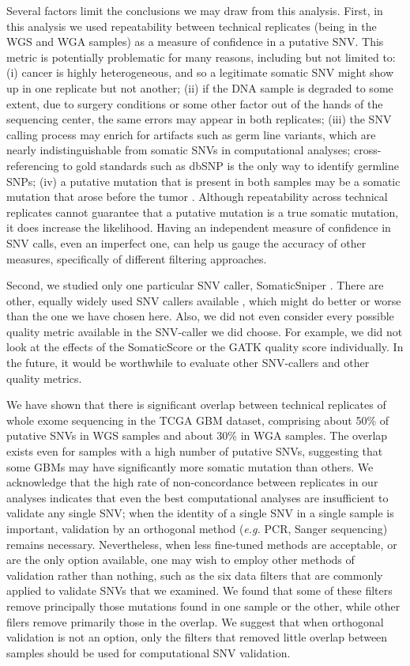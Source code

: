 \documentclass[11 pt]{article} %
\begin{document}
Several factors limit the conclusions we may draw from this analysis. First, in this analysis we used repeatability between technical replicates (being in the WGS and WGA samples) as a measure of confidence in a putative SNV. This metric is potentially problematic for many reasons, including but not limited to: (i) cancer is highly heterogeneous, and so a legitimate somatic SNV might show up in one replicate but not another; (ii) if the DNA sample is degraded to some extent, due to surgery conditions or some other factor out of the hands of the sequencing center, the same errors may appear in both replicates; (iii) the SNV calling process may enrich for artifacts such as germ line variants, which are nearly indistinguishable from somatic SNVs in computational analyses; cross-referencing to gold standards such as dbSNP is the only way to identify germline SNPs; (iv) a putative mutation that is present in both samples may be a somatic mutation that arose before the tumor \citep{pre-tumor-muts}. Although repeatability across technical replicates cannot guarantee that a putative mutation is a true somatic mutation, it does increase the likelihood. Having an independent measure of confidence in SNV calls, even an imperfect one, can help us gauge the accuracy of other measures, specifically of different filtering approaches. 

Second, we studied only one particular SNV caller, SomaticSniper \citep{SomaticSniper}. There are other, equally widely used SNV callers available \citep{MuTect, VarScan, Strelka}, which might do better or worse than the one we have chosen here. Also, we did not even consider every possible quality metric available in the SNV-caller we did choose. For example, we did not look at the effects of the SomaticScore or the GATK quality score individually. In the future, it would be worthwhile to evaluate other SNV-callers and other quality metrics.

We have shown that there is significant overlap between technical replicates of whole exome sequencing in the TCGA GBM dataset, comprising about 50\% of putative SNVs in WGS samples and about 30\% in WGA samples. The overlap exists even for samples with a high number of putative SNVs, suggesting that some GBMs may have significantly more somatic mutation than others. We acknowledge that the high rate of non-concordance between replicates in our analyses indicates that even the best computational analyses are insufficient to validate any single SNV; when the identity of a single SNV in a single sample is important, validation by an orthogonal method (\textit{e.g.} PCR, Sanger sequencing) remains necessary. Nevertheless, when less fine-tuned methods are acceptable, or are the only option available, one may wish to employ other methods of validation rather than nothing, such as the six data filters that are commonly applied to validate SNVs that we examined. We found that some of these filters remove principally those mutations found in one sample or the other, while other filers remove primarily those in the overlap. We suggest that when orthogonal validation is not an option, only the filters that removed little overlap between samples should be used for computational SNV validation.
\end{document}
